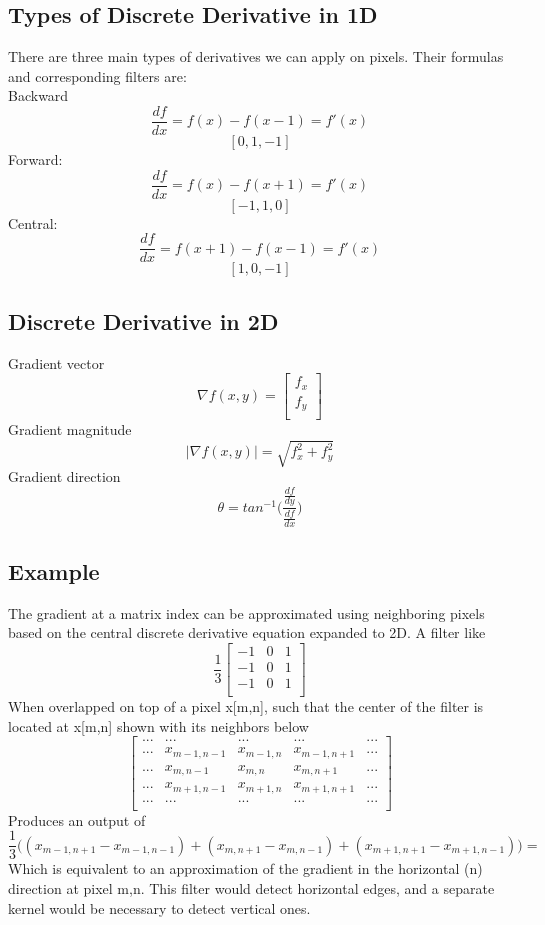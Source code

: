 \documentclass{article}
\begin{document}
\subsection{Types of Discrete Derivative in 1D}
There are three main types of derivatives we can apply on pixels. Their formulas and corresponding filters are:\\
Backward
$$\frac{df}{dx} = f(x) - f(x-1) = f'(x)$$
$$[0, 1, -1]$$
Forward:
$$\frac{df}{dx} = f(x) - f(x+1) = f'(x)$$
$$[-1, 1, 0]$$
Central:
$$\frac{df}{dx} = f(x+1) - f(x-1) = f'(x)$$
$$[1, 0, -1]$$
\subsection{Discrete Derivative in 2D}
Gradient vector
$$ \nabla f(x,y) = \begin{bmatrix} f_x\\ 
f_y\\
\end{bmatrix}  $$
Gradient magnitude
$$ |\nabla f(x,y)| = \sqrt{f_x^2 + f_y^2}$$
Gradient direction
$$ \theta = tan^{-1}\Big( \frac{\frac{df}{dy}}{\frac{df}{dx}}\Big)$$

\subsection{Example}
The gradient at a matrix index can be approximated using neighboring pixels based on the central discrete derivative equation expanded to 2D. A filter like
$$ \frac{1}{3}\begin{bmatrix} -1 & 0 & 1\\
-1 & 0 & 1 \\
-1 & 0 & 1 \\\end{bmatrix}$$
When overlapped on top of a pixel x[m,n], such that the center of the filter is located at x[m,n] shown with its neighbors below 
$$ \begin{bmatrix}
...&...&...&...&...\\
...&x_{m-1,n-1} & x_{m-1,n} & x_{m-1,n+1}&... \\
...&x_{m,n-1} & x_{m,n} & x_{m,n+1}&...\\
...&x_{m+1,n-1} & x_{m+1,n} & x_{m+1,n+1}&...\\
...&...&...&...&...\\
\end{bmatrix}
$$
Produces an output of 
$$\frac{1}{3}\Big((x_{m-1,n+1} - x_{m-1,n-1})+ (x_{m,n+1}-x_{m,n-1}) + (x_{m+1,n+1} - x_{m+1,n-1})\Big) = $$
Which is equivalent to an approximation of the gradient in the horizontal (n) direction at pixel m,n. This filter would detect horizontal edges, and a separate kernel would be necessary to detect vertical ones.   
\end{document}
